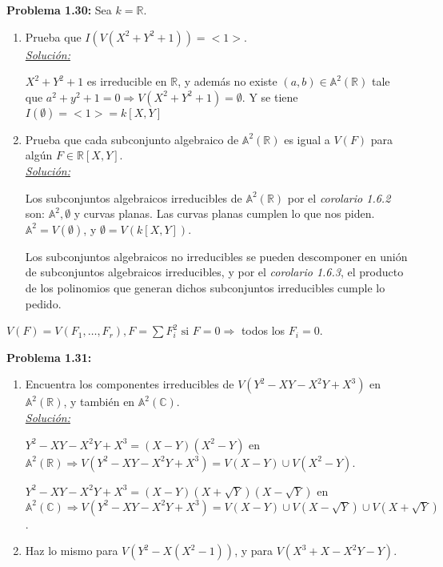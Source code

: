 \textbf{Problema 1.30: } Sea $k=\mathbb{R}$.
\begin{enumerate}
\item Prueba que $I(V(X^2+Y^2+1))=<1>$. \\
  \underline{\textit{Solución: }}

  $X^2+Y^2+1$ es irreducible en $\mathbb{R}$, y además no existe $(a,b)\in \mathbb{A}^2(\mathbb{R})$ tale que $a^2+y^2+1=0 \Rightarrow V(X^2+Y^2+1)=\emptyset.$ Y se tiene $ I(\emptyset) = <1> =k[X,Y]$
\item Prueba que cada subconjunto algebraico de $\mathbb{A}^2(\mathbb{R})$ es igual a $V(F)$ para algún $F\in \mathbb{R}[X,Y]$. \\
  \underline{\textit{Solución: }}

  Los subconjuntos algebraicos irreducibles de $\mathbb{A}^2(\mathbb{R})$ por el \textit{corolario 1.6.2} son: $\mathbb{A}^2, \emptyset$ y curvas planas. Las curvas planas cumplen lo que nos piden. $\mathbb{A}^2=V(\emptyset)$, y $\emptyset = V(k[X,Y])$.

  Los subconjuntos algebraicos no irreducibles se pueden descomponer en unión de subconjuntos algebraicos irreducibles, y por el \textit{corolario 1.6.3}, el producto de los polinomios que generan dichos subconjuntos irreducibles cumple lo pedido.
\end{enumerate}

\begin{nota}
$V(F)=V(F_1,\dots,F_r), F=\sum F_i^2 \text{ si } F=0 \Rightarrow$ todos los $F_i=0$.
\end{nota}

\textbf{Problema 1.31: }
\begin{enumerate}
\item Encuentra los componentes irreducibles de $V(Y^2-XY-X^2Y+X^3)$ en $\mathbb{A}^2(\mathbb{R})$, y también en $\mathbb{A}^2(\mathbb{C})$. \\
  \underline{\textit{Solución: }}

  $Y^2-XY-X^2Y+X^3=(X-Y)(X^2-Y)$ en $\mathbb{A}^2(\mathbb{R}) \Rightarrow V(Y^2-XY-X^2Y+X^3)=V(X-Y)\cup V(X^2-Y)$.

  $Y^2 − XY − X^2Y + X^3= (X-Y)(X+\sqrt{Y})(X-\sqrt{Y})$ en $\mathbb{A}^2(\mathbb{C}) \Rightarrow V(Y^2-XY-X^2Y+X^3)=V(X-Y)\cup V(X-\sqrt{Y})\cup V(X+\sqrt{Y})$.
  
\item Haz lo mismo para $V(Y^2-X(X^2-1))$, y para $V(X^3+X-X^2Y-Y)$.
  
\end{enumerate}
